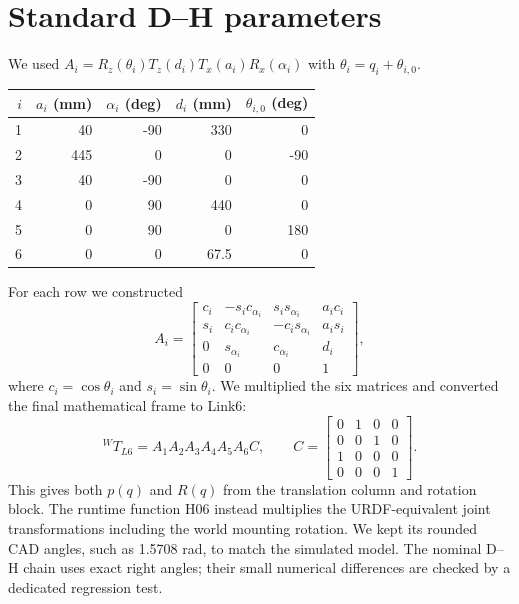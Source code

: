 \documentclass[11pt,a4paper]{report}
\begin{document}
\section{Standard D--H parameters}
We used $A_i=R_z(\theta_i)T_z(d_i)T_x(a_i)R_x(\alpha_i)$ with $\theta_i=q_i+\theta_{i,0}$.
\begin{center}\begin{tabular}{rrrrr}\toprule
$i$ & $a_i$ (mm) & $\alpha_i$ (deg) & $d_i$ (mm) & $\theta_{i,0}$ (deg)\\\midrule
1&40&-90&330&0\\2&445&0&0&-90\\3&40&-90&0&0\\4&0&90&440&0\\5&0&90&0&180\\6&0&0&67.5&0\\\bottomrule
\end{tabular}\end{center}
For each row we constructed
\begin{equation}
A_i=\begin{bmatrix}
c_i&-s_i c_{\alpha_i}&s_i s_{\alpha_i}&a_i c_i\\
s_i&c_i c_{\alpha_i}&-c_i s_{\alpha_i}&a_i s_i\\
0&s_{\alpha_i}&c_{\alpha_i}&d_i\\0&0&0&1
\end{bmatrix},
\end{equation}
where $c_i=\cos\theta_i$ and $s_i=\sin\theta_i$. We multiplied the six matrices and converted the final mathematical frame to Link6:
\begin{equation}
{}^WT_{L6}=A_1A_2A_3A_4A_5A_6C,\qquad
C=\begin{bmatrix}0&1&0&0\\0&0&1&0\\1&0&0&0\\0&0&0&1\end{bmatrix}.
\end{equation}
This gives both $p(q)$ and $R(q)$ from the translation column and rotation block. The runtime function H06 instead multiplies the URDF-equivalent joint transformations including the world mounting rotation. We kept its rounded CAD angles, such as 1.5708 rad, to match the simulated model. The nominal D--H chain uses exact right angles; their small numerical differences are checked by a dedicated regression test.
\end{document}
